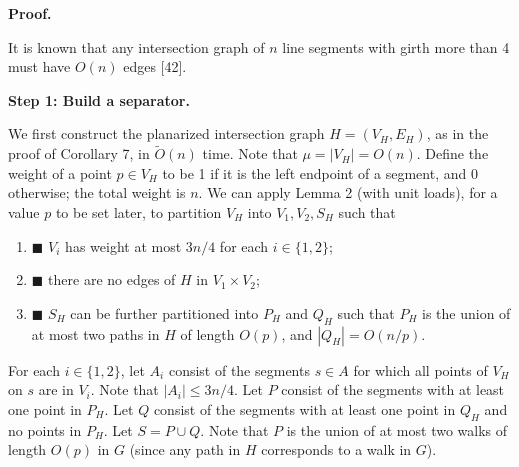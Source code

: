 \par
\par
\par\medskip\noindent\textbf{Proof.}\par
It is known that any intersection graph of $n$ line segments with girth more than 4 must have $O(n)$ edges [42].
\par
\par
\par\medskip\noindent\textbf{Step 1: Build a separator.}\par
We first construct the planarized intersection graph $H=(V_{H},E_{H})$, as in the proof of Corollary 7, in $\widetilde{O}(n)$ time. Note that $\mu=|V_{H}|=O(n)$. Define the weight of a point $p\in V_{H}$ to be 1 if it is the left endpoint of a segment, and 0 otherwise; the total weight is $n$. We can apply Lemma 2 (with unit loads), for a value $p$ to be set later, to partition $V_{H}$ into $V_{1},V_{2},S_{H}$ such that
\par
\begin{enumerate}
\item[]  $\blacksquare$ 
$V_{i}$ has weight at most $3n/4$ for each $i\in\{1,2\}$;
\par
\par
\item[]  $\blacksquare$ 
there are no edges of $H$ in $V_{1}\times V_{2}$;
\par
\par
\item[]  $\blacksquare$ 
$S_{H}$ can be further partitioned into $P_{H}$ and $Q_{H}$ such that $P_{H}$ is the union of at most two paths in $H$ of length $O(p)$, and $|Q_{H}|=O(n/p)$.
\par
\par
\end{enumerate}
For each $i\in\{1,2\}$, let $A_{i}$ consist of the segments $s\in A$ for which all points of $V_{H}$ on $s$ are in $V_{i}$. Note that $|A_{i}|\leq 3n/4$. Let $P$ consist of the segments with at least one point in $P_{H}$. Let $Q$ consist of the segments with at least one point in $Q_{H}$ and no points in $P_{H}$. Let $S=P\cup Q$. Note that $P$ is the union of at most two walks of length $O(p)$ in $G$ (since any path in $H$ corresponds to a walk in $G$).
\par
\par
